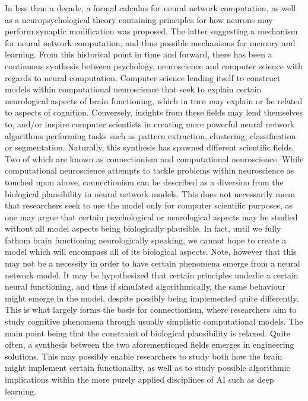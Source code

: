 In less than a decade, a formal calculus for neural network computation, as well as a neuropsychological theory containing principles for how neurons may perform synaptic modification was proposed. The latter suggesting a mechanism for neural network computation, and thus possible mechanisms for memory and learning. From this historical point in time and forward, there has been a continuous synthesis between psychology, neuroscience and computer science with regards to neural computation. Computer science lending itself to construct models within computational neuroscience that seek to explain certain neurological aspects of brain functioning, which in turn may explain or be related to aspects of cognition. Conversely, insights from these fields may lend themselves to, and/or inspire computer scientists in creating more powerful neural network algorithms performing tasks such as pattern extraction, clustering, classification or segmentation. 
Naturally, this synthesis has spawned different scientific fields. Two of which are known as connectionism and computational neuroscience. While computational neuroscience attempts to tackle problems within neuroscience as touched upon above, connectionism can be described as a diversion from the biological plausibility in neural network models. This does not necessarily mean that researchers seek to use the model only for computer scientific purposes, as one may argue that certain psychological or neurological aspects may be studied without all model aspects being biologically plausible. In fact, until we fully fathom brain functioning neurologically speaking, we cannot hope to create a model which will encompass all of its biological aspects. Note, however that this may not be a necessity in order to have certain phenomena emerge from a neural network model. It may be hypothesized that certain principles underlie a certain neural functioning, and thus if simulated algorithmically, the same behaviour might emerge in the model, despite possibly being implemented quite differently. This is what largely forms the basis for connectionism, where researchers aim to study cognitive phenomena through usually simplistic computational models. The main point being that the constraint of biological plausibility is relaxed.
Quite often, a synthesis between the two aforementioned fields emerges in engineering solutions. This may possibly enable researchers to study both how the brain might implement certain functionality, as well as to study possible algorithmic implications within the more purely applied disciplines of AI such as deep learning.
\\

